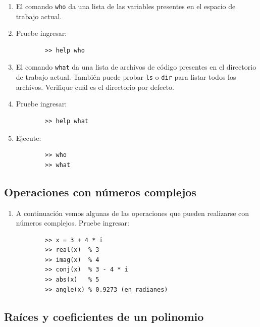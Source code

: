 \documentclass[11pt,a4paper,openany]{book}
\begin{document}
\begin{enumerate}
	\item El comando \texttt{who} da una lista de las variables presentes en el espacio de trabajo actual.
	\item Pruebe ingresar:
	\begin{verbatim}
		>> help who
	\end{verbatim}
	
	\item El comando \texttt{what} da una lista de archivos de código presentes en el directorio de trabajo actual. También puede probar \texttt{ls} o \texttt{dir} para listar todos los archivos. Verifique cuál es el directorio por defecto.
	\item Pruebe ingresar:
	\begin{verbatim}
		>> help what
	\end{verbatim}
	
	\item Ejecute:
	\begin{verbatim}
		>> who
		>> what
	\end{verbatim}
\end{enumerate}

\subsection{Operaciones con números complejos}

\begin{enumerate}
	\item A continuación vemos algunas de las operaciones que pueden realizarse con números complejos. Pruebe ingresar:
	\begin{verbatim}
		>> x = 3 + 4 * i
		>> real(x)  % 3
		>> imag(x)  % 4
		>> conj(x)  % 3 - 4 * i
		>> abs(x)   % 5
		>> angle(x) % 0.9273 (en radianes)
	\end{verbatim}
\end{enumerate}

\subsection{Raíces y coeficientes de un polinomio}
\end{document}
